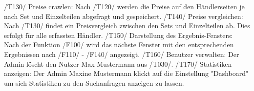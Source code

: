 \newline
/T130/ \newline
Preise crawlen: Nach /T120/ werden die Preise auf den Händlerseiten je nach Set und Einzelteilen abgefragt und gespeichert. \newline
\newline
/T140/ \newline
Preise vergleichen: Nach  /T130/ findet ein Preisvergleich zwischen den Sets und Einzelteilen ab. Dies erfolgt für alle erfassten Händler. \newline
\newline
/T150/ \newline
Darstellung des Ergebnis-Fensters: Nach der Funktion /F100/ wird das nächste Fenster mit den entsprechenden Ergebnissen nach /F110/ - /F140/ angezeigt. \newline
\newline
/T160/ \newline
Benutzer verwalten: Der Admin löscht den Nutzer Max Mustermann aus /T030/. \newline
\newline
/T170/ \newline
Statistiken anzeigen: Der Admin Maxine Mustermann klickt auf die Einstellung "Dashboard" um sich Statistiken zu den Suchanfragen anzeigen zu lassen. \newline
